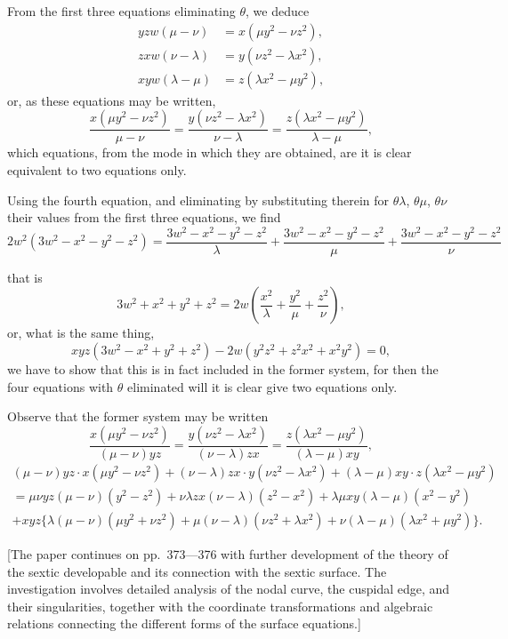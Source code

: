 \documentclass[11pt,a4paper]{article}
\theoremstyle{definition}
\begin{document}
From the first three equations eliminating $\theta$, we deduce
\begin{align*}
yzw(\mu - \nu) &= x(\mu y^2 - \nu z^2),\\
zxw(\nu - \lambda) &= y(\nu z^2 - \lambda x^2),\\
xyw(\lambda - \mu) &= z(\lambda x^2 - \mu y^2),
\end{align*}
or, as these equations may be written,
\[
\frac{x(\mu y^2 - \nu z^2)}{\mu - \nu} = \frac{y(\nu z^2 - \lambda x^2)}{\nu - \lambda} = \frac{z(\lambda x^2 - \mu y^2)}{\lambda - \mu},
\]
which equations, from the mode in which they are obtained, are it is clear equivalent to two equations only.

Using the fourth equation, and eliminating by substituting therein for $\theta\lambda$, $\theta\mu$, $\theta\nu$ their values from the first three equations, we find
\[
2w^2\left(3w^2 - x^2 - y^2 - z^2\right) = \frac{3w^2 - x^2 - y^2 - z^2}{\lambda} + \frac{3w^2 - x^2 - y^2 - z^2}{\mu} + \frac{3w^2 - x^2 - y^2 - z^2}{\nu}
\]

\newpage

that is
\[
3w^2 + x^2 + y^2 + z^2 = 2w\left(\frac{x^2}{\lambda} + \frac{y^2}{\mu} + \frac{z^2}{\nu}\right),
\]
or, what is the same thing,
\[
xyz(3w^2 - x^2 + y^2 + z^2) - 2w(y^2z^2 + z^2x^2 + x^2y^2) = 0,
\]
we have to show that this is in fact included in the former system, for then the four equations with $\theta$ eliminated will it is clear give two equations only.

Observe that the former system may be written
\[
\frac{x(\mu y^2 - \nu z^2)}{(\mu - \nu)yz} = \frac{y(\nu z^2 - \lambda x^2)}{(\nu - \lambda)zx} = \frac{z(\lambda x^2 - \mu y^2)}{(\lambda - \mu)xy},
\]
\begin{multline*}
(\mu - \nu)yz \cdot x(\mu y^2 - \nu z^2) + (\nu - \lambda)zx \cdot y(\nu z^2 - \lambda x^2) + (\lambda - \mu)xy \cdot z(\lambda x^2 - \mu y^2) \\
= \mu\nu yz(\mu - \nu)(y^2 - z^2) + \nu\lambda zx(\nu - \lambda)(z^2 - x^2) + \lambda\mu xy(\lambda - \mu)(x^2 - y^2) \\
+ xyz\{\lambda(\mu - \nu)(\mu y^2 + \nu z^2) + \mu(\nu - \lambda)(\nu z^2 + \lambda x^2) + \nu(\lambda - \mu)(\lambda x^2 + \mu y^2)\}.
\end{multline*}

\newpage

[The paper continues on pp.~373---376 with further development of the theory of the sextic developable and its connection with the sextic surface. The investigation involves detailed analysis of the nodal curve, the cuspidal edge, and their singularities, together with the coordinate transformations and algebraic relations connecting the different forms of the surface equations.]
\end{document}
